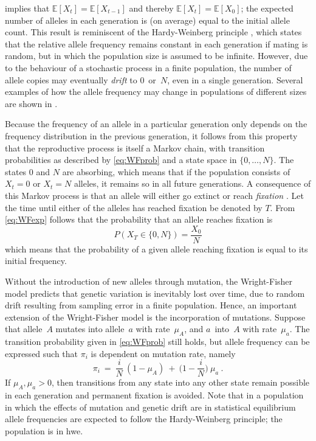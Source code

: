  implies that ${\mathbb{E}[X_t] = \mathbb{E}[X_{t-1}]}$ and thereby ${\mathbb{E}[X_t] = \mathbb{E}[X_0]}$; \ie the expected number of alleles in each generation is (on average) equal to the initial allele count.
This result is reminiscent of the Hardy-Weinberg principle \citep{Hardy:1908wx,Weinberg:1908tr}, which states that the relative allele frequency remains constant in each generation if mating is random, but in which the population size is assumed to be infinite.
However, due to the behaviour of a stochastic process in a finite population, the number of allele copies may eventually \emph{drift} to $0$~or~$N$, even in a single generation.
Several examples of how the allele frequency may change in populations of different sizes are shown in .

%

%

Because the frequency of an allele in a particular generation only depends on the frequency distribution in the previous generation, it follows from this property that the reproductive process is itself a Markov chain, with transition probabilities as described by \cref{eq:WFprob} and a state space in $\{0,\ldots,N\}$.
The states $0$ and $N$ are absorbing, which means that if the population consists of ${X_t=0}$ or ${X_t=N}$ alleles, it remains so in all future generations.
A consequence of this Markov process is that an allele will either go extinct or reach \emph{fixation} \citep[\eg, see][]{ewens2012}.
Let the time until either of the  alleles has reached fixation be denoted by $T$.
From \cref{eq:WFexp} follows that the probability that an allele reaches fixation is
\begin{equation}
	P(X_T \in \{0,N\}) = \frac{X_0}{N}
\end{equation}
which means that the probability of a given allele reaching fixation is equal to its initial frequency.

Without the introduction of new alleles through mutation, the Wright-Fisher model predicts that genetic variation is inevitably lost over time, due to random drift resulting from sampling error in a finite population. \label{ref:mutgendiv}
Hence, an important extension of the Wright-Fisher model is the incorporation of mutations.
Suppose that allele~$A$ mutates into allele~$a$ with rate~$\mu_A$, and $a$~into~$A$ with rate~$\mu_a$.
The transition probability given in \cref{eq:WFprob} still holds, but allele frequency can be expressed such that $\pi_i$ is dependent on mutation rate, namely
\begin{equation}
	\pi_i ~=~ \frac{i}{N} ~ (1 - \mu_A) ~+~ \Big( 1 - \frac{i}{N} \Big) ~ \mu_a \ .
\end{equation}
If ${\mu_A, \mu_a > 0}$, then transitions from any state into any other state remain possible in each generation and permanent  fixation is avoided.
Note that in a population in which the effects of mutation and genetic drift are in statistical equilibrium allele frequencies are expected to follow the Hardy-Weinberg principle; \ie the population is in \gls{hwe}.


